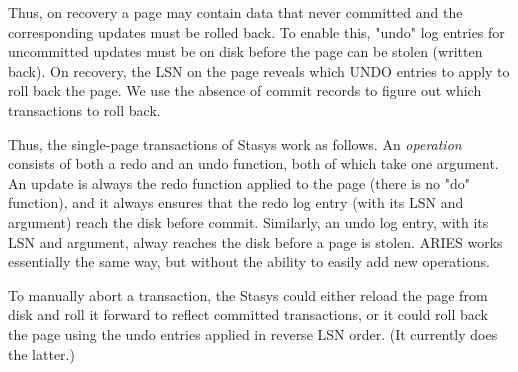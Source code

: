 \documentclass[letterpaper,twocolumn,10pt]{article}
\newcommand{\yad}{Stasys\xspace}
\begin{document}
Thus, on recovery a page may contain data that never committed and the
corresponding updates must be rolled back.  To enable this, "undo" log
entries for uncommitted updates must be on disk before the page can be
stolen (written back).  On recovery, the LSN on the page reveals which
UNDO entries to apply to roll back the page. We use the absence of
commit records to figure out which transactions to roll back.

Thus, the single-page transactions of \yad work as follows.  An {\em
operation} consists of both a redo and an undo function, both of which
take one argument. An update is always the redo function applied to
the page (there is no "do" function), and it always ensures that the
redo log entry (with its LSN and argument) reach the disk before
commit.  Similarly, an undo log entry, with its LSN and argument,
alway reaches the disk before a page is stolen.  ARIES works
essentially the same way, but without the ability to easily add new
operations.

To manually abort a transaction, the \yad could either reload the page
from disk and roll it forward to reflect committed transactions, or it
could roll back the page using the undo entries applied in reverse LSN
order. (It currently does the latter.)
\end{document}
